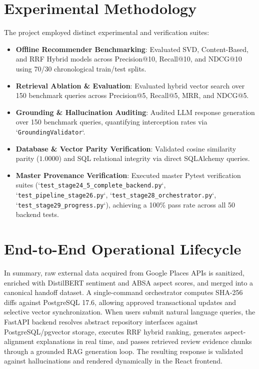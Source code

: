 \section{Experimental Methodology}
The project employed distinct experimental and verification suites:
\begin{itemize}
    \item \textbf{Offline Recommender Benchmarking}: Evaluated SVD, Content-Based, and RRF Hybrid models across Precision@10, Recall@10, and NDCG@10 using 70/30 chronological train/test splits.
    \item \textbf{Retrieval Ablation \& Evaluation}: Evaluated hybrid vector search over 150 benchmark queries across Precision@5, Recall@5, MRR, and NDCG@5.
    \item \textbf{Grounding \& Hallucination Auditing}: Audited LLM response generation over 150 benchmark queries, quantifying interception rates via `\texttt{GroundingValidator}`.
    \item \textbf{Database \& Vector Parity Verification}: Validated cosine similarity parity ($1.0000$) and SQL relational integrity via direct SQLAlchemy queries.
    \item \textbf{Master Provenance Verification}: Executed master Pytest verification suites (`\texttt{test\_stage24\_5\_complete\_backend.py}`, `\texttt{test\_pipeline\_stage26.py}`, `\texttt{test\_stage28\_orchestrator.py}`, `\texttt{test\_stage29\_progress.py}`), achieving a 100\% pass rate across all 50 backend tests.
\end{itemize}

\section{End-to-End Operational Lifecycle}
In summary, raw external data acquired from Google Places APIs is sanitized, enriched with DistilBERT sentiment and ABSA aspect scores, and merged into a canonical handoff dataset. A single-command orchestrator computes SHA-256 diffs against PostgreSQL 17.6, allowing approved transactional updates and selective vector synchronization. When users submit natural language queries, the FastAPI backend resolves abstract repository interfaces against PostgreSQL/pgvector storage, executes RRF hybrid ranking, generates aspect-alignment explanations in real time, and passes retrieved review evidence chunks through a grounded RAG generation loop. The resulting response is validated against hallucinations and rendered dynamically in the React frontend.
